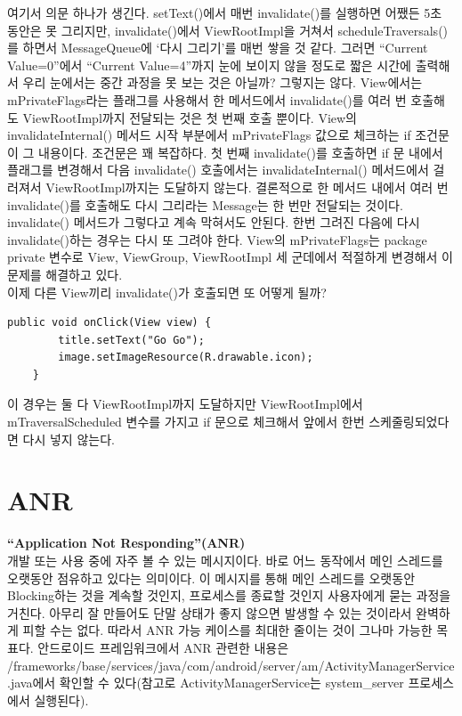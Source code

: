 여기서 의문 하나가 생긴다. 
setText()에서 매번 invalidate()를 실행하면 어쨌든 5초 동안은 못 그리지만, 
invalidate()에서 ViewRootImpl을 거쳐서 scheduleTraversals()를 하면서 MessageQueue에 `다시 그리기'를 매번 쌓을 것 같다. 
그러면 ``Current Value=0''에서 ``Current Value=4''까지 눈에 보이지 않을 정도로 짧은 시간에 출력해서 우리 눈에서는 중간 과정을 못 보는 것은 아닐까?
그렇지는 않다. View에서는 mPrivateFlags라는 플래그를 사용해서 한 메서드에서 invalidate()를 여러 번 호출해도 ViewRootImpl까지 전달되는 것은 첫 번째 호출 뿐이다. 
View의 invalidateInternal() 메서드 시작 부분에서 mPrivateFlags 값으로 체크하는 if 조건문이 그 내용이다.
조건문은 꽤 복잡하다. 첫 번째 invalidate()를 호출하면 if 문 내에서 플래그를 변경해서 다음 invalidate() 호출에서는 invalidateInternal() 메서드에서 걸러져서 ViewRootImpl까지는 도달하지 않는다. 결론적으로 한 메서드 내에서 여러 번 invalidate()를 호출해도 다시 그리라는 Message는 한 번만 전달되는 것이다.\\

invalidate() 메서드가 그렇다고 계속 막혀서도 안된다. 
한번 그려진 다음에 다시 invalidate()하는 경우는 다시 또 그려야 한다.
View의 mPrivateFlags는 package private 변수로 View, ViewGroup, ViewRootImpl 세 군데에서 적절하게 변경해서 이 문제를 해결하고 있다.\\

이제 다른 View끼리 invalidate()가 호출되면 또 어떻게 될까?
\begin{lstlisting}[frame=single] 
	public void onClick(View view) {
		title.setText("Go Go");
		image.setImageResource(R.drawable.icon);
	}
\end{lstlisting}
이 경우는 둘 다 ViewRootImpl까지 도달하지만 ViewRootImpl에서 mTraversalScheduled 변수를 가지고 if 문으로 체크해서 앞에서 한번 스케줄링되었다면 다시 넣지 않는다.

\section{ANR}
\textbf{``Application Not Responding''(ANR)}\\
개발 또는 사용 중에 자주 볼 수 있는 메시지이다. 바로 어느 동작에서 메인 스레드를 오랫동안 점유하고 있다는 의미이다.
이 메시지를 통해 메인 스레드를 오랫동안 Blocking하는 것을 계속할 것인지, 프로세스를 종료할 것인지 사용자에게 묻는 과정을 거친다. 
아무리 잘 만들어도 단말 상태가 좋지 않으면 발생할 수 있는 것이라서 완벽하게 피할 수는 없다. 따라서 ANR 가능 케이스를 최대한 줄이는 것이 그나마 가능한 목표다.
안드로이드 프레임워크에서 ANR 관련한 내용은 
/frameworks/base/services/java/com/android/server/am/ActivityManagerService.java에서 확인할 수 있다(참고로 ActivityManagerService는 system\_server 프로세스에서 실행된다).\\

